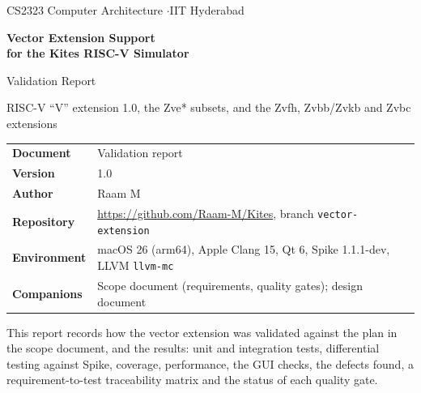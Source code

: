\documentclass[11pt]{article}
\begin{document}
\begin{titlepage}
\thispagestyle{empty}
\vspace*{1.2cm}
{\sffamily\small\color{kgrey} CS2323 Computer Architecture \quad$\cdot$\quad IIT Hyderabad}\par
\vspace{0.6cm}
{\sffamily\bfseries\fontsize{26}{31}\selectfont\color{kblue} Vector Extension Support\\[2pt] for the Kites RISC-V Simulator\par}
\vspace{0.5cm}
{\sffamily\Large\color{kteal} Validation Report\par}
\vspace{0.2cm}
{\large RISC-V ``V'' extension 1.0, the Zve* subsets, and the Zvfh, Zvbb/Zvkb and Zvbc extensions\par}
\vspace{1.4cm}

\begin{tabularx}{\textwidth}{@{}L{3.6cm}Y@{}}
\toprule
\textsf{\textbf{Document}}   & Validation report \\
\textsf{\textbf{Version}}    & 1.0 \\
\textsf{\textbf{Author}}     & Raam M \\
\textsf{\textbf{Repository}} & \url{https://github.com/Raam-M/Kites}, branch \texttt{vector-extension} \\
\textsf{\textbf{Environment}} & macOS 26 (arm64), Apple Clang 15, Qt 6, Spike 1.1.1-dev, LLVM \texttt{llvm-mc} \\
\textsf{\textbf{Companions}} & Scope document (requirements, quality gates); design document \\
\bottomrule
\end{tabularx}

\vspace{1.0cm}
\begin{keybox}[title=Purpose of this document]
This report records how the vector extension was validated against the plan in the scope
document, and the results: unit and integration tests, differential testing against Spike,
coverage, performance, the GUI checks, the defects found, a requirement-to-test traceability
matrix and the status of each quality gate.
\end{keybox}
\vfill
\end{titlepage}

\tableofcontents
\clearpage
\end{document}
